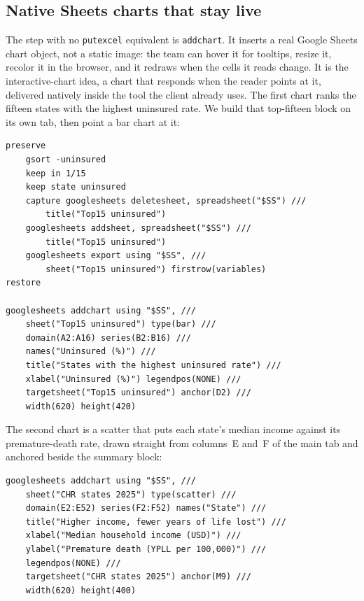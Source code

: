 \subsection{Native Sheets charts that stay live}
The step with no \texttt{putexcel} equivalent is \texttt{addchart}. It inserts a real Google Sheets chart object, not a static image: the team can hover it for tooltips, resize it, recolor it in the browser, and it redraws when the cells it reads change. It is the interactive-chart idea, a chart that responds when the reader points at it, delivered natively inside the tool the client already uses. The first chart ranks the fifteen states with the highest uninsured rate. We build that top-fifteen block on its own tab, then point a bar chart at it:
\par
{\footnotesize
\begin{verbatim}
preserve
    gsort -uninsured
    keep in 1/15
    keep state uninsured
    capture googlesheets deletesheet, spreadsheet("$SS") ///
        title("Top15 uninsured")
    googlesheets addsheet, spreadsheet("$SS") ///
        title("Top15 uninsured")
    googlesheets export using "$SS", ///
        sheet("Top15 uninsured") firstrow(variables)
restore

googlesheets addchart using "$SS", ///
    sheet("Top15 uninsured") type(bar) ///
    domain(A2:A16) series(B2:B16) ///
    names("Uninsured (%)") ///
    title("States with the highest uninsured rate") ///
    xlabel("Uninsured (%)") legendpos(NONE) ///
    targetsheet("Top15 uninsured") anchor(D2) ///
    width(620) height(420)
\end{verbatim}
}
The second chart is a scatter that puts each state's median income against its premature-death rate, drawn straight from columns~E and~F of the main tab and anchored beside the summary block:
\par
{\footnotesize
\begin{verbatim}
googlesheets addchart using "$SS", ///
    sheet("CHR states 2025") type(scatter) ///
    domain(E2:E52) series(F2:F52) names("State") ///
    title("Higher income, fewer years of life lost") ///
    xlabel("Median household income (USD)") ///
    ylabel("Premature death (YPLL per 100,000)") ///
    legendpos(NONE) ///
    targetsheet("CHR states 2025") anchor(M9) ///
    width(620) height(400)
\end{verbatim}
}
